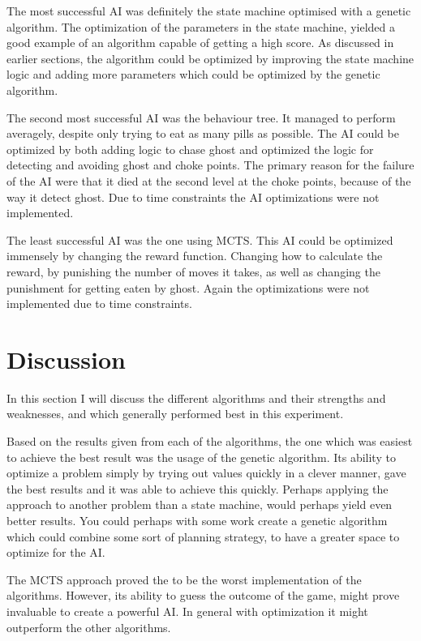 \documentclass[conference,compsoc]{IEEEtran}
\begin{document}
The most successful AI was definitely the state machine optimised with a genetic algorithm. The optimization of the parameters in the state machine, yielded a good example of an algorithm capable of getting a high score.
As discussed in earlier sections, the algorithm could be optimized by improving the state machine logic and adding more parameters which could be optimized by the genetic algorithm. 

The second most successful AI was the behaviour tree. It managed to perform averagely, despite only trying to eat as many pills as possible. 
The AI could be optimized by both adding logic to chase ghost and optimized the logic for detecting and avoiding ghost and choke points. The primary reason for the failure of the AI were that it died at the second level at the choke points, because of the way it detect ghost. 
Due to time constraints the AI optimizations were not implemented. 

The least successful AI was the one using MCTS. This AI could be optimized immensely by changing the reward function. Changing how to calculate the reward, by punishing the number of moves it takes, as well as changing the punishment for 
getting eaten by ghost. 
Again the optimizations were not implemented due to time constraints.

\section{Discussion}
In this section I will discuss the different algorithms and their strengths and weaknesses, and which generally performed best in this experiment. 

Based on the results given from each of the algorithms, the one which was easiest to achieve the best result was the usage of the genetic algorithm. Its ability to optimize a problem simply by trying out values quickly in a clever manner, gave the best results and it was able to achieve this quickly.
Perhaps applying the approach to another problem than a state machine, would perhaps yield even better results. You could perhaps with some work create a genetic algorithm which could combine some sort of planning strategy, to have a greater space to optimize for the AI.

The MCTS approach proved the to be the worst implementation of the algorithms. However, its ability to guess the outcome of the game, might prove invaluable to create a powerful AI. In general with optimization it might outperform the other algorithms. 
\end{document}
